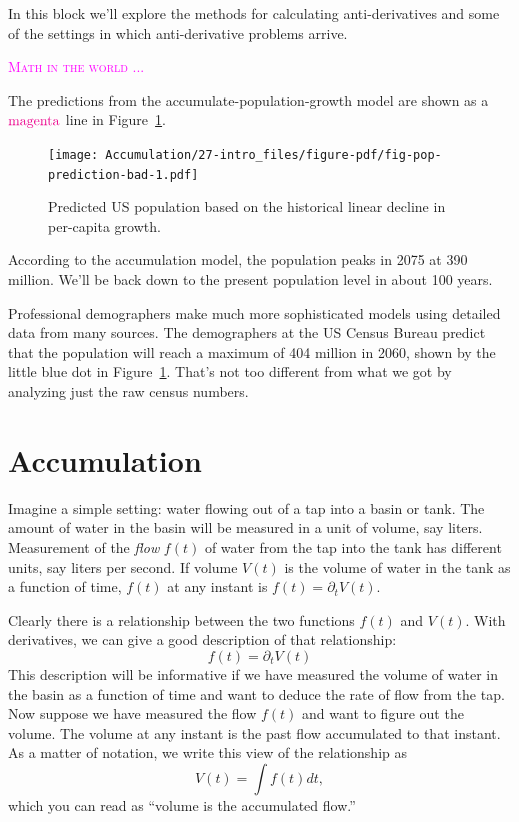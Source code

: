 \documentclass[
  letterpaper,
  DIV=11,
  numbers=noendperiod,
  oneside]{scrreprt}
\newenvironment{intheworld}%
{%
\textcolor{magenta}{\hrulefill}%
  \par\vspace{.3\baselineskip}%
  \textcolor{magenta}{\scshape Math in the world ...}%
  \par\vspace{\baselineskip}%
}%
{\textcolor{magenta}{\hrulefill}}
\begin{document}
In this block we'll explore the methods for calculating anti-derivatives
and some of the settings in which anti-derivative problems arrive.

\begin{intheworld}
The predictions from the accumulate-population-growth model are shown as
a \(\color{magenta}{\text{magenta}}\) line in
Figure~\ref{fig-pop-prediction-bad}.

\begin{figure}

{\centering \texttt{[image: Accumulation/27-intro\_files/figure-pdf/fig-pop-prediction-bad-1.pdf]}

}

\caption{\label{fig-pop-prediction-bad}Predicted US population based on
the historical linear decline in per-capita growth.}

\end{figure}

According to the accumulation model, the population peaks in 2075 at 390
million. We'll be back down to the present population level in about 100
years.

Professional demographers make much more sophisticated models using
detailed data from many sources. The demographers at the US Census
Bureau predict that the population will reach a maximum of 404 million
in 2060, shown by the little blue dot in
Figure~\ref{fig-pop-prediction-bad}. That's not too different from what
we got by analyzing just the raw census numbers.

\end{intheworld}

\hypertarget{accumulation}{%
\section{Accumulation}\label{accumulation}}

Imagine a simple setting: water flowing out of a tap into a basin or
tank. The amount of water in the basin will be measured in a unit of
volume, say liters. Measurement of the \emph{flow} \(f(t)\) of water
from the tap into the tank has different units, say liters per second.
If volume \(V(t)\) is the volume of water in the tank as a function of
time, \(f(t)\) at any instant is \(f(t) = \partial_t V(t)\).

Clearly there is a relationship between the two functions \(f(t)\) and
\(V(t)\). With derivatives, we can give a good description of that
relationship: \[f(t) = \partial_t V(t)\] This description will be
informative if we have measured the volume of water in the basin as a
function of time and want to deduce the rate of flow from the tap. Now
suppose we have measured the flow \(f(t)\) and want to figure out the
volume. The volume at any instant is the past flow accumulated to that
instant. As a matter of notation, we write this view of the relationship
as \[V(t) = \int f(t) dt,\] which you can read as ``volume is the
accumulated flow.''
\end{document}
